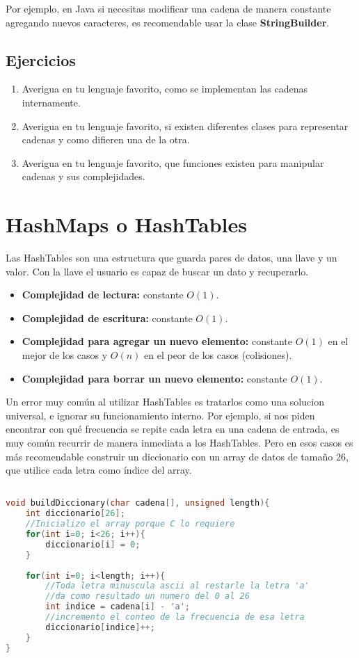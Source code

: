 Por ejemplo, en Java si necesitas modificar una cadena de manera constante agregando nuevos caracteres, es recomendable usar la clase \textbf{StringBuilder}.

\subsection{Ejercicios}

\begin{enumerate}
    \item Averigua en tu lenguaje favorito, como se implementan las cadenas internamente.
    \item Averigua en tu lenguaje favorito, si existen diferentes clases para representar cadenas y como difieren una de la otra.
    \item Averigua en tu lenguaje favorito, que funciones existen para manipular cadenas y sus complejidades.
\end{enumerate}

\section{HashMaps o HashTables}

Las HashTables son una estructura que guarda pares de datos, una llave y un valor. 
Con la llave el usuario es capaz de buscar un dato y recuperarlo. 

\begin{itemize}
    \item \textbf{Complejidad de lectura:} constante $O(1)$.
    \item \textbf{Complejidad de escritura:} constante $O(1)$.
    \item \textbf{Complejidad para agregar un nuevo elemento:} constante $O(1)$ en el mejor de los casos y $O(n)$ en el peor de los casos (colisiones).
    \item \textbf{Complejidad para borrar un nuevo elemento:} constante $O(1)$.
\end{itemize}

Un error muy común al utilizar HashTables es tratarlos como una solucion universal, e ignorar su funcionamiento interno. Por ejemplo, si nos piden encontrar con qué frecuencia se repite cada letra en una cadena de entrada, es muy común recurrir de manera inmediata a los HashTables. Pero en esos casos es más recomendable construir un diccionario con un array de datos de tamaño 26, que utilice cada letra como índice del array.

\begin{lstlisting}[language=C, caption=Diccionario sin hashtables]

void buildDiccionary(char cadena[], unsigned length){
    int diccionario[26];
    //Inicializo el array porque C lo requiere
    for(int i=0; i<26; i++){
        diccionario[i] = 0;
    }
    
    for(int i=0; i<length; i++){
        //Toda letra minuscula ascii al restarle la letra 'a'
        //da como resultado un numero del 0 al 26
        int indice = cadena[i] - 'a'; 
        //incremento el conteo de la frecuencia de esa letra
        diccionario[indice]++;
    }
}
\end{lstlisting}

